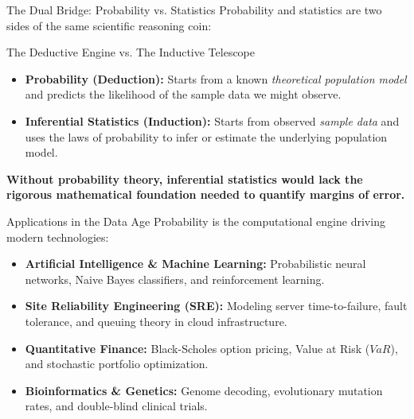 \documentclass[10pt,aspectratio=169]{beamer}
\begin{document}
\begin{frame}{The Dual Bridge: Probability vs. Statistics}
  Probability and statistics are two sides of the same scientific reasoning coin:
  
  \vspace{0.2em}
  \begin{block}{The Deductive Engine vs. The Inductive Telescope}
    \begin{itemize}
      \item \textbf{Probability (Deduction):} Starts from a known \emph{theoretical population model} and predicts the likelihood of the sample data we might observe. \pause
      \item \textbf{Inferential Statistics (Induction):} Starts from observed \emph{sample data} and uses the laws of probability to infer or estimate the underlying population model.
    \end{itemize}
  \end{block}
  
  \vspace{0.2em}
  \pause
  \begin{center}
    \small \textbf{Without probability theory, inferential statistics would lack the rigorous mathematical foundation needed to quantify margins of error.}
  \end{center}
\end{frame}

\begin{frame}{Applications in the Data Age}
  Probability is the computational engine driving modern technologies:
  \vspace{0.4em}
  \begin{itemize}
    \item \textbf{Artificial Intelligence \& Machine Learning:} Probabilistic neural networks, Naive Bayes classifiers, and reinforcement learning. \pause
    \item \textbf{Site Reliability Engineering (SRE):} Modeling server time-to-failure, fault tolerance, and queuing theory in cloud infrastructure. \pause
    \item \textbf{Quantitative Finance:} Black-Scholes option pricing, Value at Risk ($VaR$), and stochastic portfolio optimization. \pause
    \item \textbf{Bioinformatics \& Genetics:} Genome decoding, evolutionary mutation rates, and double-blind clinical trials.
  \end{itemize}
\end{frame}
\end{document}
